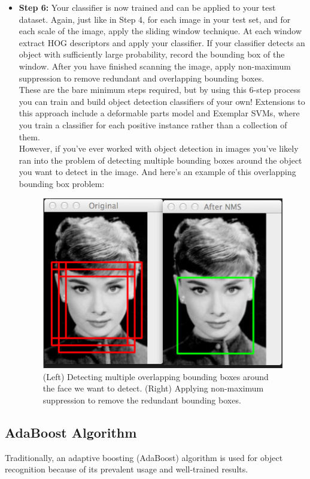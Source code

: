 \begin{itemize}
            \item \textbf{Step 6:} Your classifier is now trained and can be applied to your test dataset. Again, just like in Step 4, for each image in your test set, and for each scale of the image, apply the sliding window technique. 
                At each window extract HOG descriptors and apply your classifier. If your classifier detects an object with sufficiently large probability, record the bounding box of the window. After you have finished scanning the image, 
                apply non-maximum suppression to remove redundant and overlapping bounding boxes. \\ 
                \vspace{2mm}
                These are the bare minimum steps required, but by using this 6-step process you can train and build object detection classifiers of your own! Extensions to this approach include a deformable parts model and Exemplar SVMs, 
                where you train a classifier for each positive instance rather than a collection of them. \\ 
                \vspace{2mm}
                However, if you’ve ever worked with object detection in images you’ve likely ran into the problem of detecting multiple bounding boxes around the object you want to detect in the image. And here’s an example of this overlapping bounding box problem:
                \begin{figure}[H]
                    \centering
                    \includegraphics[width=0.6\linewidth]{img/multiple-overlapping.jpg}
                    \caption{(Left) Detecting multiple overlapping bounding boxes around the face we want to detect. (Right) Applying non-maximum suppression to remove the redundant bounding boxes.}
                \end{figure}
        \end{itemize}
    \subsection{AdaBoost Algorithm}
        Traditionally, an adaptive boosting (AdaBoost) algorithm is used for object recognition because of its prevalent usage and well-trained results. 

